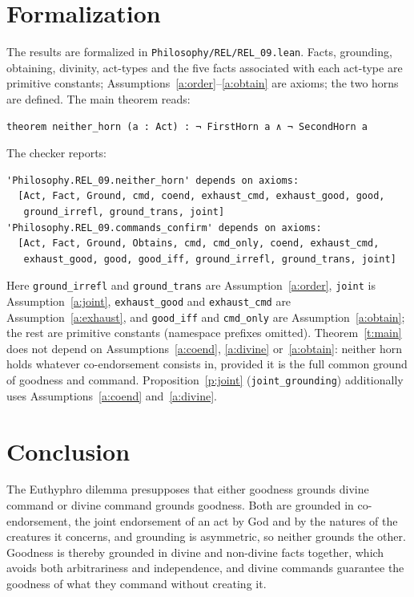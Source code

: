 \documentclass{situationist-preprint}
\begin{document}
\section{Formalization}

The results are formalized in \nolinkurl{Philosophy/REL/REL_09.lean}. Facts, grounding, obtaining, divinity, act-types and the five facts associated with each act-type are primitive constants; Assumptions~\ref{a:order}--\ref{a:obtain} are axioms; the two horns are defined. The main theorem reads:

\begin{lstlisting}
theorem neither_horn (a : Act) : ¬ FirstHorn a ∧ ¬ SecondHorn a
\end{lstlisting}

\noindent The checker reports:

\begin{lstlisting}
'Philosophy.REL_09.neither_horn' depends on axioms:
  [Act, Fact, Ground, cmd, coend, exhaust_cmd, exhaust_good, good,
   ground_irrefl, ground_trans, joint]
'Philosophy.REL_09.commands_confirm' depends on axioms:
  [Act, Fact, Ground, Obtains, cmd, cmd_only, coend, exhaust_cmd,
   exhaust_good, good, good_iff, ground_irrefl, ground_trans, joint]
\end{lstlisting}

\noindent Here \texttt{ground\_irrefl} and \texttt{ground\_trans} are Assumption~\ref{a:order}, \texttt{joint} is Assumption~\ref{a:joint}, \texttt{exhaust\_good} and \texttt{exhaust\_cmd} are Assumption~\ref{a:exhaust}, and \texttt{good\_iff} and \texttt{cmd\_only} are Assumption~\ref{a:obtain}; the rest are primitive constants (namespace prefixes omitted). Theorem~\ref{t:main} does not depend on Assumptions~\ref{a:coend}, \ref{a:divine} or~\ref{a:obtain}: neither horn holds whatever co-endorsement consists in, provided it is the full common ground of goodness and command. Proposition~\ref{p:joint} (\texttt{joint\_grounding}) additionally uses Assumptions~\ref{a:coend} and~\ref{a:divine}.

\section{Conclusion}

The Euthyphro dilemma presupposes that either goodness grounds divine command or divine command grounds goodness. Both are grounded in co-endorsement, the joint endorsement of an act by God and by the natures of the creatures it concerns, and grounding is asymmetric, so neither grounds the other. Goodness is thereby grounded in divine and non-divine facts together, which avoids both arbitrariness and independence, and divine commands guarantee the goodness of what they command without creating it.
\end{document}
